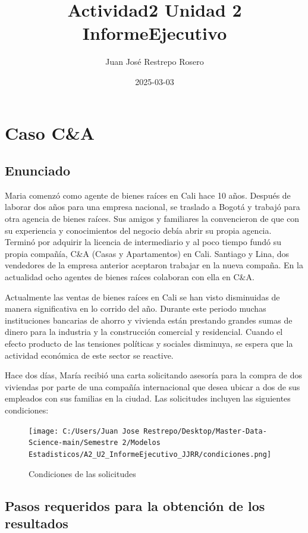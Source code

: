 \documentclass[
]{article}
\title{Actividad2 Unidad 2 InformeEjecutivo}
\author{Juan José Restrepo Rosero}
\date{2025-03-03}
\begin{document}
\maketitle

{
\setcounter{tocdepth}{2}
\tableofcontents
}
\section{\texorpdfstring{\textbf{Caso C\&A}}{Caso C\&A}}\label{caso-ca}

\subsection{\texorpdfstring{\textbf{Enunciado}}{Enunciado}}\label{enunciado}

Maria comenzó como agente de bienes raíces en Cali hace 10 años. Después
de laborar dos años para una empresa nacional, se traslado a Bogotá y
trabajó para otra agencia de bienes raíces. Sus amigos y familiares la
convencieron de que con su experiencia y conocimientos del negocio debía
abrir su propia agencia. Terminó por adquirir la licencia de
intermediario y al poco tiempo fundó su propia compañía, C\&A (Casas y
Apartamentos) en Cali. Santiago y Lina, dos vendedores de la empresa
anterior aceptaron trabajar en la nueva compaña. En la actualidad ocho
agentes de bienes raíces colaboran con ella en C\&A.

Actualmente las ventas de bienes raíces en Cali se han visto disminuidas
de manera significativa en lo corrido del año. Durante este periodo
muchas instituciones bancarias de ahorro y vivienda están prestando
grandes sumas de dinero para la industria y la construcción comercial y
residencial. Cuando el efecto producto de las tensiones políticas y
sociales disminuya, se espera que la actividad económica de este sector
se reactive.

Hace dos días, María recibió una carta solicitando asesoría para la
compra de dos viviendas por parte de una compañía internacional que
desea ubicar a dos de sus empleados con sus familias en la ciudad. Las
solicitudes incluyen las siguientes condiciones:

\begin{figure}
\centering
\texttt{[image: C:/Users/Juan Jose Restrepo/Desktop/Master-Data-Science-main/Semestre 2/Modelos Estadisticos/A2\_U2\_InformeEjecutivo\_JJRR/condiciones.png]}
\caption{Condiciones de las solicitudes}
\end{figure}

\subsection{\texorpdfstring{\textbf{Pasos requeridos para la obtención
de los
resultados}}{Pasos requeridos para la obtención de los resultados}}\label{pasos-requeridos-para-la-obtenciuxf3n-de-los-resultados}
\end{document}
